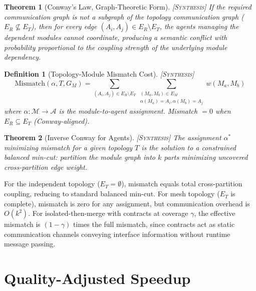 \documentclass[11pt, a4paper, copyright]{googledeepmind}
\newtheorem{definition}{Definition}[section]
\newtheorem{theorem}{Theorem}[section]
\newcommand{\synthesis}{\textsc{[Synthesis]}}
\begin{document}
\begin{theorem}[Conway's Law, Graph-Theoretic Form] \synthesis{}
\label{thm:conway}
If the required communication graph is not a subgraph of the topology communication graph ($E_R \not\subseteq E_T$), then for every edge $(A_i, A_j) \in E_R \setminus E_T$, the agents managing the dependent modules cannot coordinate, producing a semantic conflict with probability proportional to the coupling strength of the underlying module dependency.
\end{theorem}

\begin{definition}[Topology-Module Mismatch Cost] \synthesis{}
\begin{equation}
  \mathrm{Mismatch}(\alpha, T, G_M) = \sum_{(A_i, A_j) \in E_R \setminus E_T} \sum_{\substack{(M_a, M_b) \in E_M \\ \alpha(M_a)=A_i, \alpha(M_b)=A_j}} w(M_a, M_b)
\end{equation}
where $\alpha: \mathcal{M} \to \mathcal{A}$ is the module-to-agent assignment.
Mismatch $= 0$ when $E_R \subseteq E_T$ (Conway-aligned).
\end{definition}

\begin{theorem}[Inverse Conway for Agents] \synthesis{}
\label{thm:inverse-conway}
The assignment $\alpha^*$ minimizing mismatch for a given topology $T$ is the solution to a constrained balanced min-cut: partition the module graph into $k$ parts minimizing uncovered cross-partition edge weight.
\end{theorem}

For the independent topology ($E_T = \emptyset$), mismatch equals total cross-partition coupling, reducing to standard balanced min-cut.
For mesh topology ($E_T$ is complete), mismatch is zero for any assignment, but communication overhead is $O(k^2)$.
For isolated-then-merge with contracts at coverage $\gamma$, the effective mismatch is $(1-\gamma)$ times the full mismatch, since contracts act as static communication channels conveying interface information without runtime message passing.


\section{Quality-Adjusted Speedup}
\label{sec:qas}
\end{document}
